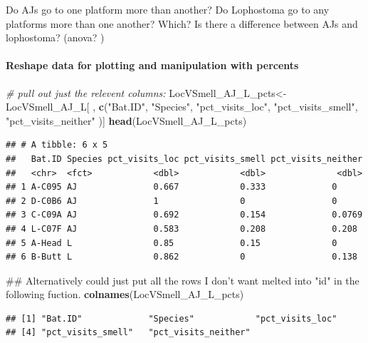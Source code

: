 \documentclass[]{article}
\newenvironment{Shaded}{\begin{snugshade}}{\end{snugshade}}
\newcommand{\KeywordTok}[1]{\textcolor[rgb]{0.13,0.29,0.53}{\textbf{{#1}}}}
\newcommand{\StringTok}[1]{\textcolor[rgb]{0.31,0.60,0.02}{{#1}}}
\newcommand{\CommentTok}[1]{\textcolor[rgb]{0.56,0.35,0.01}{\textit{{#1}}}}
\newcommand{\NormalTok}[1]{{#1}}
\let\oldparagraph\paragraph
\renewcommand{\paragraph}[1]{\oldparagraph{#1}\mbox{}}
\begin{document}
Do AJs go to one platform more than another? Do Lophostoma go to any
platforms more than one another? Which? Is there a difference between
AJs and lophostoma? (anova? )

\paragraph{Reshape data for plotting and manipulation with
percents}\label{reshape-data-for-plotting-and-manipulation-with-percents-1}

\begin{Shaded}
\begin{Highlighting}[]
\CommentTok{# pull out just the relevent columns: }
\NormalTok{LocVSmell_AJ_L_pcts<-}\StringTok{ }\NormalTok{LocVSmell_AJ_L[ , }\KeywordTok{c}\NormalTok{(}\StringTok{"Bat.ID"}\NormalTok{, }\StringTok{"Species"}\NormalTok{, }\StringTok{"pct_visits_loc"}\NormalTok{, }\StringTok{"pct_visits_smell"}\NormalTok{, }\StringTok{"pct_visits_neither"} \NormalTok{)]}
\KeywordTok{head}\NormalTok{(LocVSmell_AJ_L_pcts)}
\end{Highlighting}
\end{Shaded}

\begin{verbatim}
## # A tibble: 6 x 5
##   Bat.ID Species pct_visits_loc pct_visits_smell pct_visits_neither
##   <chr>  <fct>            <dbl>            <dbl>              <dbl>
## 1 A-C095 AJ               0.667            0.333             0     
## 2 D-C0B6 AJ               1                0                 0     
## 3 C-C09A AJ               0.692            0.154             0.0769
## 4 L-C07F AJ               0.583            0.208             0.208 
## 5 A-Head L                0.85             0.15              0     
## 6 B-Butt L                0.862            0                 0.138
\end{verbatim}

\begin{Shaded}
\begin{Highlighting}[]
\NormalTok{## Alternatively could just put all the rows I don't want melted into "id" in the following fuction. }
\KeywordTok{colnames}\NormalTok{(LocVSmell_AJ_L_pcts)}
\end{Highlighting}
\end{Shaded}

\begin{verbatim}
## [1] "Bat.ID"             "Species"            "pct_visits_loc"    
## [4] "pct_visits_smell"   "pct_visits_neither"
\end{verbatim}
\end{document}
